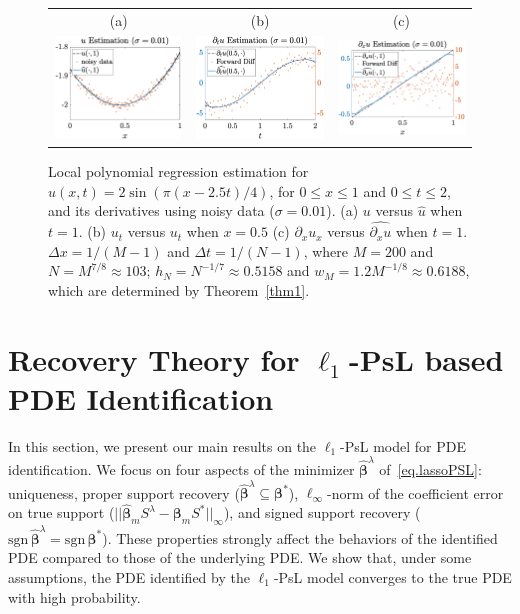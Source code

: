 \documentclass[a4paper,11pt]{article}
\newcommand{\bbeta}{\bm{\beta}}
\begin{document}
\begin{figure}
\centering
\begin{tabular}{ccc}
(a)&(b)&(c)\\
\includegraphics[width=2in]{Figures/localpolyExp1_slow.eps}&
\includegraphics[width=2in]{Figures/localpolyExp3_slow.eps}&
\includegraphics[width=2in]{Figures/localpolyExp2_slow.eps}
\end{tabular}
\caption{Local polynomial regression estimation for  $u(x,t) = 2\sin(\pi(x-2.5t)/4)$, for $0\leq x\leq 1$ and $0\leq t\leq 2$, and its derivatives using noisy data ($\sigma=0.01$). (a) $u$ versus $\widehat{u}$ when $t=1$. (b) $u_t$ versus $\widehat{u_t}$ when $x=0.5$ (c) $\partial_xu_x$ versus $\widehat{\partial_xu}$ when $t=1$.  $\Delta x=1/(M-1)$ and $\Delta t = 1/(N-1)$, where $M=200$ and $N=M^{7/8}\approx103$; $h_N=N^{-1/7}\approx0.5158$ and $w_M=1.2M^{-1/8}\approx0.6188$, which are determined by Theorem~\ref{thm1}.}\label{fig.derapprox}	
\end{figure}
 

 

\section{Recovery Theory for $\ell_1$-PsL based PDE Identification}
In this section, we present our main results on the $\ell_1$-PsL model for PDE identification. We focus on four aspects of the minimizer $\widehat{\bbeta}^\lambda$ of~\eqref{eq.lassoPSL}: uniqueness, proper support recovery ($\widehat{\bbeta}^\lambda\subseteq\bbeta^*$), $\ell_\infty$-norm of the coefficient error on true support ($||\widehat{\bbeta}_mS^\lambda-\bbeta_mS^*||_\infty$), and signed support recovery ($\text{sgn}\,\widehat{\bbeta}^\lambda=\text{sgn}\,\bbeta^*$). These properties strongly affect the behaviors of the identified PDE compared to those of the underlying PDE. We show that, under some assumptions, the PDE identified by the $\ell_1$-PsL model converges to the true PDE with high probability. 
\end{document}
